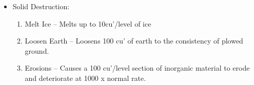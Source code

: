 \documentclass[oneside,12pt]{book}
\begin{document}
\begin{flushleft}
\begin{description}
{\begin{itemize}
\begin{enumerate}
every other round to attempt to get rid of the Demon.
\item Neurosis –Target has an extreme dislike for any specific
thing the caster chooses; target has a 50\% chance, modified
by their Self Discipline stat bonus, of overcoming the
neurosis when given a choice (e.g., neurosis concerning
horses would mean that every time the target tried to get on
or near a horse they would only have a 50\% chance).
\end{enumerate}
\item Solid Destruction:
\begin{enumerate}
\scriptsize
\item Melt Ice – Melts up to 10cu’/level of ice
\item Loosen Earth – Loosens 100 cu’ of earth to the
consistency of plowed ground.
\item Erosions – Causes a 100 cu’/level section of inorganic
material to erode and deteriorate at 1000 x normal rate.
\end{enumerate}
\end{itemize}
}
\end{description}
\clearpage

\end{flushleft}
\end{document}

